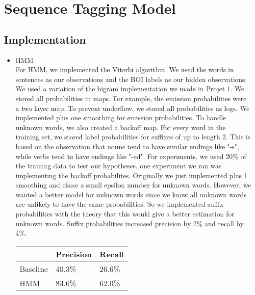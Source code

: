 \documentclass[12pt]{article}
\begin{document}
\maketitle

\section{Sequence Tagging Model}
\subsection{Implementation}
\begin{itemize}
\item HMM\\
For HMM, we implemented the Viterbi algorithm. We used the words in sentences as our observations and the BOI labels as our hidden observations. We used a variation of the bigram implementation we made in Projet 1. We stored all probabilities in maps. For example, the emission probabilities were a two layer map. To prevent underflow, we stored all probabilities as logs. We implemented plus one smoothing for emission probabilities. To handle unknown words, we also created a backoff map. For every word in the training set, we stored label probabilities for suffixes of up to length 2. This is based on the observation that nouns tend to have similar endings like "-s", while verbs tend to have endings like "-ed".
\newline
For experiments, we used 20\% of the training data to test our hypotheses. one experiment we ran was implementing the backoff probabilites. Originally we just implemented plus 1 smoothing and chose a small epsilon number for unknown words. However, we wanted a better model for unknown words since we know all unknown words are unlikely to have the same probabilities. So we implemented suffix probabilities with the theory that this would give a better estimation for unknown words. Suffix probabilities increased precision by 2\% and recall by 4\%.
\newline
\begin{tabular}{|l|l|l|}
\hline
& Precision & Recall \\
\hline
Baseline & 40.3\% & 26.6\%\\
\hline
HMM      & 83.6\% & 62.0\%\\
\hline
\end{tabular}
\end{itemize}
\end{document}
